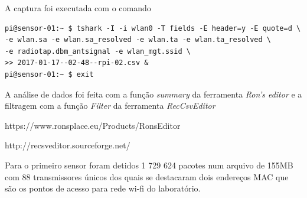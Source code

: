 A captura foi executada com o comando


\begin{lstlisting}
pi@sensor-01:~ $ tshark -I -i wlan0 -T fields -E header=y -E quote=d \
-e wlan.sa -e wlan.sa_resolved -e wlan.ta -e wlan.ta_resolved \
-e radiotap.dbm_antsignal -e wlan_mgt.ssid \
>> 2017-01-17--02-48--rpi-02.csv &
pi@sensor-01:~ $ exit
\end{lstlisting}

A análise de dados foi feita com a função \emph{summary} da ferramenta \emph{Ron’s editor}
e a filtragem com a função \emph{Filter} da ferramenta \emph{RecCsvEditor}

https://www.ronsplace.eu/Products/RonsEditor

http://recsveditor.sourceforge.net/

Para o primeiro sensor foram detidos 1 729 624 pacotes num arquivo de 155MB
com 88 transmissores únicos dos quais se destacaram dois endereços MAC que são os
pontos de acesso para rede wi-fi do laboratório.


